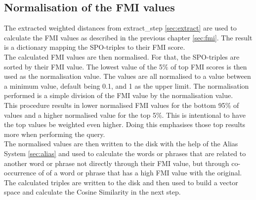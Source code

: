 \subsection{Normalisation of the FMI values}
The extracted weighted distances from extract\_step \ref{sec:extract} are used to calculate the FMI values as described in the previous chapter \ref{sec:fmi}. The result is a dictionary mapping the SPO-triples to their FMI score. \\
The calculated FMI values are then normalised. For that, the SPO-triples are sorted by their FMI value. The lowest value of the 5\% of top FMI scores is then used as the normalisation value. The values are all normalised to a value between a minimum value, default being 0.1, and 1 as the upper limit. The normalisation performed is a simple division of the FMI value by the normalisation value.\\
This procedure results in lower normalised FMI values for the bottom 95\% of values and a higher normalised value for the top 5\%. This is intentional to have the top values be weighted even higher. Doing this emphasises those top results more when performing the query.\\
The normalised values are then written to the disk with the help of the Alias System \ref{sec:alias} and used to calculate the words or phrases that are related to another word or phrase not directly through their FMI value, but through co-occurrence of of a word or phrase that has a high FMI value with the original.\\
The calculated triples are written to the disk and then used to build a vector space and calculate the Cosine Similarity in the next step.

